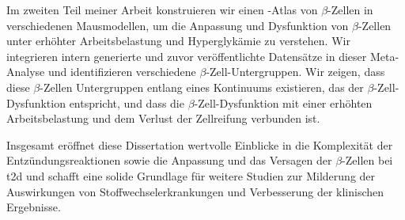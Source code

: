 \begin{zusammen}
\par Im zweiten Teil meiner Arbeit konstruieren wir einen -Atlas von $\beta$-Zellen in verschiedenen Mausmodellen, um die Anpassung und Dysfunktion von $\beta$-Zellen unter erhöhter Arbeitsbelastung und Hyperglykämie zu verstehen. Wir integrieren intern generierte und zuvor veröffentlichte Datensätze in dieser Meta-Analyse und identifizieren verschiedene $\beta$-Zell-Untergruppen. Wir zeigen, dass diese $\beta$-Zellen Untergruppen entlang eines Kontinuums existieren, das der $\beta$-Zell-Dysfunktion entspricht, und dass die $\beta$-Zell-Dysfunktion mit einer erhöhten Arbeitsbelastung und dem Verlust der Zellreifung verbunden ist.\\

\par Insgesamt eröffnet diese Dissertation wertvolle Einblicke in die Komplexität der Entzündungsreaktionen sowie die Anpassung und das Versagen der $\beta$-Zellen bei \gls{t2d} und schafft eine solide Grundlage für weitere Studien zur Milderung der Auswirkungen von Stoffwechselerkrankungen und Verbesserung der klinischen Ergebnisse. 

\end{zusammen}
